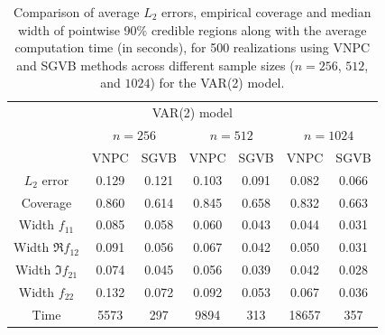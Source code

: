 \documentclass[%
 reprint,
 amsmath,amssymb,
 aps,
]{revtex4-2}
\begin{document}
\begingroup
\renewcommand{\arraystretch}{1.4} 
\begin{table}[h]
\centering
\begin{tabular}{ccccccc}
\hline
\multicolumn{7}{c}{VAR(2) model} \\
\quad & \multicolumn{2}{c}{$n=256$}  & \multicolumn{2}{c}{$n = 512$}  & \multicolumn{2}{c}{$n = 1024$}\\
\hline
\quad & {VNPC} & {SGVB} & {VNPC} & {SGVB} & {VNPC} & {SGVB}\\
{$L_2$ error} & 0.129 & 0.121 & 0.103 & 0.091 & 0.082 & 0.066\\
{Coverage} & 0.860 & 0.614 & 0.845 & 0.658 & 0.832 & 0.663\\
{Width $f_{11}$} & 0.085 & 0.058 & 0.060 & 0.043 & 0.044 & 0.031\\
{Width $\Re f_{12}$} & 0.091 & 0.056 & 0.067 & 0.042 & 0.050 & 0.031\\
{Width $\Im f_{21}$} & 0.074 & 0.045 & 0.056 & 0.039 & 0.042 & 0.028\\
{Width $f_{22}$} & 0.132 & 0.072 & 0.092 & 0.053 & 0.067& 0.036\\
{Time} & 5573 & 297 & 9894 & 313 & 18657 & 357\\
\hline
\end{tabular}
\caption{{\small Comparison of average  $L_2$ errors, empirical coverage and median width of pointwise 90\%
credible regions along with the average computation time (in seconds), for 500 realizations using VNPC and SGVB methods across different sample sizes ($n=256$, $512$, and $1024$) for the VAR(2) model.}}
\label{table l1l2 var2} 
\end{table}
\end{document}
